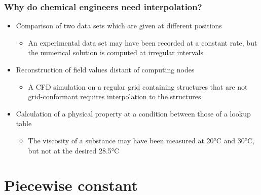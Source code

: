 \begin{frame}
  \frametitle{Why do chemical engineers need interpolation?}
  \begin{itemize}
     \item Comparison of two data sets which are given at different positions
    \begin{itemize}
      \item An experimental data set may have been recorded at a constant rate, but the numerical solution is computed at irregular intervals
    \end{itemize}
     \item Reconstruction of field values distant of computing nodes
    \begin{itemize}
       \item A CFD simulation on a regular grid containing structures that are not grid-conformant requires interpolation to the structures
    \end{itemize}
     \item Calculation of a physical property at a condition between those of a lookup table
    \begin{itemize}
       \item The viscosity of a substance may have been measured at 20\si{\celsius} and 30\si{\celsius}, but not at the desired 28.5\si{\celsius}
    \end{itemize}
  \end{itemize}
\end{frame}



\section{Piecewise constant}
